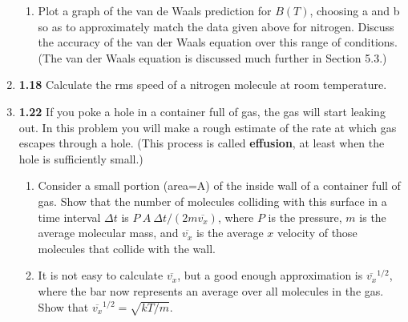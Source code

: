 \documentclass[fleqn]{article}
\begin{document}
\begin{enumerate}
\begin{enumerate}

      \item Plot a graph of the van de Waals prediction for $B(T)$, choosing a and b so as to approximately match the data given above for nitrogen. 
      Discuss the accuracy of the van der Waals equation over this range of conditions. (The van der Waals equation is discussed much further 
      in Section 5.3.)


    \end{enumerate}
    
    \item \textbf{1.18} Calculate the rms speed of a nitrogen molecule at room temperature.

    
    \item \textbf{1.22} If you poke a hole in a container full of gas, the gas will start leaking out. In this problem you 
    will make a rough estimate of the rate at which gas escapes through a hole. (This process is called \textbf{effusion}, at least when 
    the hole is sufficiently small.)

      \begin{enumerate}
        \item Consider a small portion (area=A) of the inside wall of a container full of gas. Show that the number of molecules colliding
        with this surface in a time interval $\Delta t$ is $P ~ A ~ \Delta t/(2m \overline{v_x})$, where $P$ is the pressure, $m$ is the 
        average molecular mass, and $\overline{v_x}$ is the average $x$ velocity of those molecules that collide with the wall.


        \item It is not easy to calculate $\overline{v_x}$, but a good enough approximation is $\overline{v_x}^{1/2}$, where the bar 
        now represents an average over all molecules in the gas. Show that $\overline{v_x}^{1/2}=\sqrt{kT/m}.$

          

\end{enumerate}
\end{enumerate}
\end{document}
